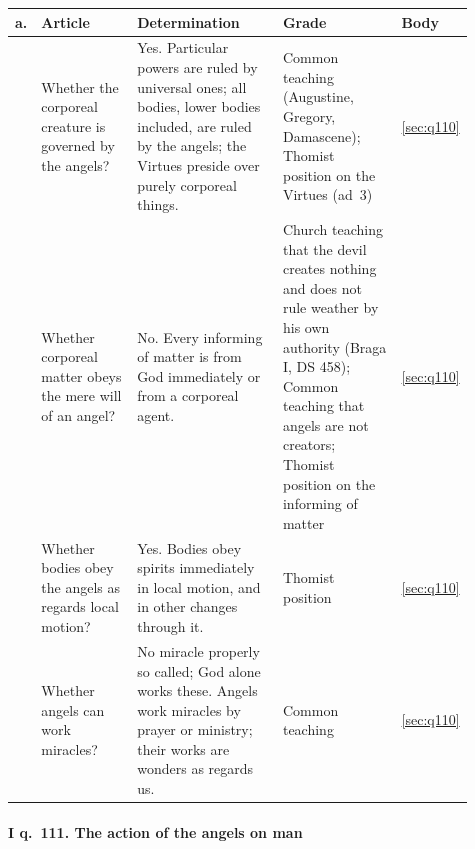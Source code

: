 \begingroup\footnotesize
\begin{longtable}{>{\raggedright\arraybackslash}p{0.03\linewidth}>{\raggedright\arraybackslash}p{0.22\linewidth}>{\raggedright\arraybackslash}p{0.33\linewidth}>{\raggedright\arraybackslash}p{0.27\linewidth}>{\raggedright\arraybackslash}p{0.06\linewidth}}
\toprule
\textbf{a.} & \textbf{Article} & \textbf{Determination} & \textbf{Grade} & \textbf{Body}\\
\midrule
\endhead
1 & Whether the corporeal creature is governed by the angels? & Yes. Particular powers are ruled by universal ones; all bodies, lower bodies included, are ruled by the angels; the Virtues preside over purely corporeal things. & Common teaching (Augustine, Gregory, Damascene); Thomist position on the Virtues (ad~3) & \ref{sec:q110}\\
2 & Whether corporeal matter obeys the mere will of an angel? & No. Every informing of matter is from God immediately or from a corporeal agent. & Church teaching that the devil creates nothing and does not rule weather by his own authority (Braga I, DS 458); Common teaching that angels are not creators; Thomist position on the informing of matter & \ref{sec:q110}\\
3 & Whether bodies obey the angels as regards local motion? & Yes. Bodies obey spirits immediately in local motion, and in other changes through it. & Thomist position & \ref{sec:q110}\\
4 & Whether angels can work miracles? & No miracle properly so called; God alone works these. Angels work miracles by prayer or ministry; their works are wonders as regards us. & Common teaching & \ref{sec:q110}\\
\bottomrule
\end{longtable}
\endgroup

\paragraph{I q.~111. The action of the angels on man}

